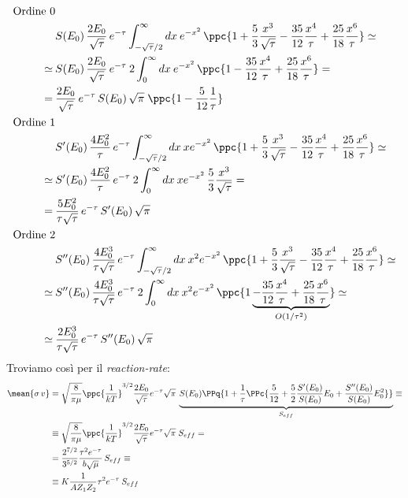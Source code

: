 \begin{displaymath}
\begin{aligned}
\text{Ordine 0}& \\
&S(E_0) \, \frac{2E_0}{\sqrt{\tau}}\,e^{-\tau} \int_{-\sqrt{\tau}/2}^\infty dx \:  e^{-x^2} \, \ppc{1+\frac{5}{3} \frac{x^3}{\sqrt{\tau}} - \frac{35}{12}\frac{x^4}{\tau} + \frac{25}{18} \frac{x^6}{\tau}}\simeq \\
\simeq\: &S(E_0) \, \frac{2E_0}{\sqrt{\tau}}\,e^{-\tau} \: 2\int_{0}^\infty dx \:  e^{-x^2} \, \ppc{1- \frac{35}{12}\frac{x^4}{\tau} + \frac{25}{18} \frac{x^6}{\tau}} = \\
= \:&\frac{2E_0}{\sqrt{\tau}}\,e^{-\tau} \,S(E_0) \,\sqrt{\pi}\; \ppc{1-\frac{5}{12}\frac{1}{\tau}} \\
\text{Ordine 1}& \\
&S'(E_0) \, \frac{4E_0^2}{\tau}\,e^{-\tau} \int_{-\sqrt{\tau}/2}^\infty dx \: x e^{-x^2} \, \ppc{1+\frac{5}{3} \frac{x^3}{\sqrt{\tau}} - \frac{35}{12}\frac{x^4}{\tau} + \frac{25}{18} \frac{x^6}{\tau}}\simeq \\
\simeq \:&S'(E_0) \, \frac{4E_0^2}{\tau}\,e^{-\tau} \:2\int_{0}^\infty dx \: x e^{-x^2} \, \frac{5}{3} \frac{x^3}{\sqrt{\tau}}= \\
=\:&\frac{5E_0^2}{\tau\sqrt{\tau}}\,e^{-\tau} \, S'(E_0) \,\sqrt{\pi} \\
\text{Ordine 2}& \\
&S''(E_0) \, \frac{4E_0^3}{\tau\sqrt{\tau}}\,e^{-\tau} \int_{-\sqrt{\tau}/2}^\infty dx \: x^2 e^{-x^2} \, \ppc{1+\frac{5}{3} \frac{x^3}{\sqrt{\tau}} - \frac{35}{12}\frac{x^4}{\tau} + \frac{25}{18} \frac{x^6}{\tau}}\simeq \\
\simeq\: &S''(E_0) \, \frac{4E_0^3}{\tau\sqrt{\tau}}\,e^{-\tau}\: 2 \int_{0}^\infty dx \: x^2 e^{-x^2} \, \ppc{1 \underbrace{- \frac{35}{12}\frac{x^4}{\tau} + \frac{25}{18} \frac{x^6}{\tau}}_{O(1/\tau^2)}}\simeq \\
\simeq \:&\frac{2E_0^3}{\tau\sqrt{\tau}}\,e^{-\tau}\,S''(E_0) \,\sqrt{\pi}
\end{aligned}
\end{displaymath}
Troviamo così per il \textit{reaction-rate}:
\begin{displaymath}
\begin{aligned}
\mean{\sigma\,v } &=  \sqrt{\frac{8}{\pi\mu}} \ppc{\frac{1}{kT}}^{3/2} \frac{2E_0}{\sqrt{\tau}}e^{-\tau}\sqrt{\pi}\: \underbrace{ S(E_0) \PPq{1+\frac{1}{\tau} \PPc{\frac{5}{12} +\frac{5}{2} \frac{S'(E_0)}{S(E_0)}E_0 + \frac{S''(E_0)}{S(E_0)}E_0^2}} }_{S_{eff}} \equiv\\
&\equiv \sqrt{\frac{8}{\pi\mu}} \ppc{\frac{1}{kT}}^{3/2} \frac{2E_0}{\sqrt{\tau}}e^{-\tau}\sqrt{\pi}\; S_{eff} =\\
&= \frac{2^{7/2}}{3^{5/2}} \frac{\tau^2 e^{-\tau}}{b\sqrt{\mu}}\, S_{eff} \equiv\\
&\equiv K \frac{1}{AZ_1Z_2} \tau^2 e^{-\tau} \: S_{eff}
\end{aligned}
\end{displaymath}
